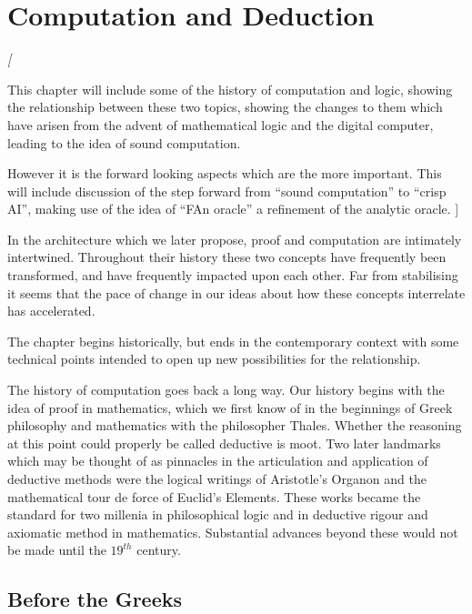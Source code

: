 
\chapter{Computation and Deduction}\label{ComputationAndDeduction}

{\it[

This chapter will include some of the history of computation and logic,
showing the relationship between these two topics, showing the
changes to them which have arisen from the advent of mathematical
logic and the digital computer, leading to the idea of sound
computation. 

However it is the forward looking aspects which are the more important.
This will include discussion of the step forward from ``sound
computation'' to ``crisp AI'', making use of the idea of ``FAn
oracle'' a refinement of the analytic oracle.
]}

In the architecture which we later propose, proof and computation are
intimately intertwined.
Throughout their history these two concepts have frequently been
transformed, and have frequently impacted upon each other.
Far from stabilising it seems that the pace of change in our ideas
about how these concepts interrelate has accelerated.

The chapter begins historically, but ends in the contemporary context
with some technical points intended to open up new possibilities for the relationship.

The history of computation goes back a long way.
Our history begins with the idea of proof in mathematics, which we
first know of in the beginnings of Greek philosophy and mathematics
with the philosopher Thales.
Whether the reasoning at this point could properly be called deductive
is moot.
Two later landmarks which may be thought of as pinnacles in the
articulation and application of deductive methods were the logical
writings of Aristotle's Organon and the mathematical tour de force of Euclid's
Elements.
These works became the standard for two millenia in philosophical
logic and in deductive rigour and axiomatic method in mathematics.
Substantial advances beyond these would not be made until the
$19^{th}$ century.


\section{Before the Greeks}

